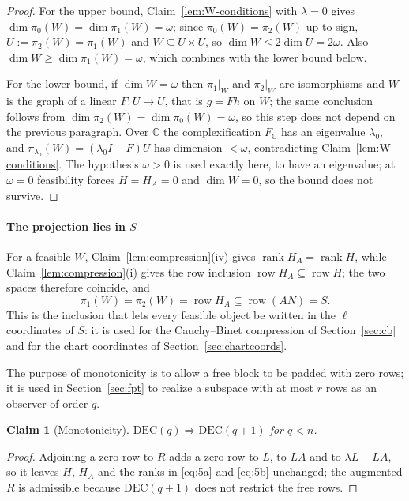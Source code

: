 \documentclass[journal]{IEEEtran}
\theoremstyle{plainn}
\newtheorem{claim}{Claim}
\theoremstyle{remark}
\begin{document}
\begin{proof}
For the upper bound, Claim~\ref{lem:W-conditions} with $\lambda=0$ gives
$\dim\pi_0(W)=\dim\pi_1(W)=\omega$; since $\pi_0(W)=\pi_2(W)$ up to sign,
$U:=\pi_2(W)=\pi_1(W)$ and $W\subseteq U\times U$, so $\dim W\le2\dim U=2\omega$. Also
$\dim W\ge\dim\pi_1(W)=\omega$, which combines with the lower bound below.

For the lower bound, if $\dim W=\omega$ then $\pi_1|_W$ and $\pi_2|_W$ are isomorphisms and $W$ is the
graph of a linear $F:U\to U$, that is $g=Fh$ on $W$; the same conclusion follows from
$\dim\pi_2(W)=\dim\pi_0(W)=\omega$, so this step does not depend on the previous paragraph. Over
$\mathbb C$ the complexification $F_{\mathbb C}$ has an eigenvalue $\lambda_0$, and
$\pi_{\lambda_0}(W)=(\lambda_0I-F)U$ has dimension $<\omega$, contradicting
Claim~\ref{lem:W-conditions}. The hypothesis $\omega>0$ is used exactly here, to have an eigenvalue;
at $\omega=0$ feasibility forces $H=H_A=0$ and $\dim W=0$, so the bound does not survive.
\end{proof}

\paragraph*{The projection lies in $S$}\label{sec:US}
For a feasible $W$, Claim~\ref{lem:compression}(iv) gives
$\operatorname{rank}H_A=\operatorname{rank}H$, while Claim~\ref{lem:compression}(i) gives the row
inclusion $\operatorname{row}H_A\subseteq\operatorname{row}H$; the two spaces therefore coincide, and
\begin{equation*}
\pi_1(W)=\pi_2(W)=\operatorname{row}H_A\subseteq\operatorname{row}(AN)=S .
\end{equation*}
This is the inclusion that lets every feasible object be written in the $\ell$ coordinates of
$S$: it is used for the Cauchy--Binet compression of Section~\ref{sec:cb} and for the chart
coordinates of Section~\ref{sec:chartcoords}.

The purpose of monotonicity is to allow a free block to be padded with zero rows; it is used in Section~\ref{sec:fpt} to realize a subspace with at most $r$ rows as an observer of order $q$.

\begin{claim}[Monotonicity]\label{lem:monotone}
$\mathrm{DEC}(q)\Rightarrow\mathrm{DEC}(q+1)$ for $q<n$.
\end{claim}

\begin{proof}
Adjoining a zero row to $R$ adds a zero row to $L$, to $LA$ and to $\lambda L-LA$, so it leaves $H$,
$H_A$ and the ranks in \eqref{eq:5a} and \eqref{eq:5b} unchanged; the augmented $R$ is admissible because
$\mathrm{DEC}(q+1)$ does not restrict the free rows.
\end{proof}
\end{document}

